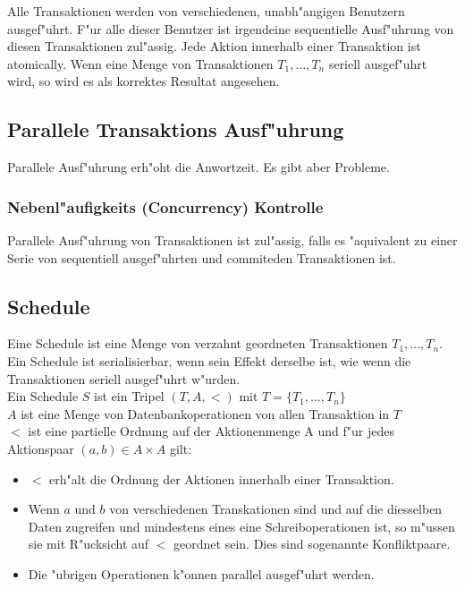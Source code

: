 \documentclass[german, 10pt, a4paper, twocolumn]{scrartcl}
\theoremstyle{definition}
\theoremstyle{remark}
\theoremstyle{example}
\begin{document}
Alle Transaktionen werden von verschiedenen, unabh"angigen Benutzern ausgef"uhrt. F"ur alle dieser Benutzer ist irgendeine sequentielle Ausf"uhrung von diesen Transaktionen zul"assig. Jede Aktion innerhalb einer Transaktion ist atomically. Wenn eine Menge von Transaktionen $T_1,\ldots, T_n$ seriell ausgef"uhrt wird, so wird es als korrektes Resultat angesehen.

\subsection{Parallele Transaktions Ausf"uhrung}

Parallele Ausf"uhrung erh"oht die Anwortzeit. Es gibt aber Probleme.

\subsubsection{Nebenl"aufigkeits (Concurrency) Kontrolle}

Parallele Ausf"uhrung von Transaktionen ist zul"assig, falls es "aquivalent zu einer Serie von sequentiell ausgef"uhrten und commiteden Transaktionen ist.

\subsection{Schedule}

Eine Schedule ist eine Menge von verzahnt geordneten Transaktionen $T_1,\ldots, T_n$. Ein Schedule ist serialisierbar, wenn sein Effekt derselbe ist, wie wenn die Transaktionen seriell ausgef"uhrt w"urden.\\

Ein Schedule $S$ ist ein Tripel $(T,A, <)$ mit
$T=\{T_1,\ldots, T_n\}$\\
$A$ ist eine Menge von Datenbankoperationen von allen Transaktion in $T$\\
$<$ ist eine partielle Ordnung auf der Aktionenmenge A und f"ur jedes Aktionspaar $(a,b) \in A \times A$ gilt:
\begin{itemize}
	\item $<$ erh"alt die Ordnung der Aktionen innerhalb einer Transaktion.
	\item Wenn $a$ und $b$ von verschiedenen Transkationen sind und auf die diesselben Daten zugreifen und mindestens eines eine Schreiboperationen ist, so m"ussen sie mit R"ucksicht auf $<$ geordnet sein. Dies sind sogenannte Konfliktpaare.
	\item Die "ubrigen Operationen k"onnen parallel ausgef"uhrt werden.
\end{itemize}
\end{document}
